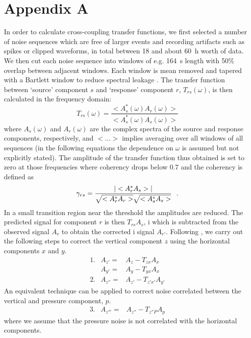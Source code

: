 \documentclass{article}
\begin{document}
{\section*{Appendix A}
In order to calculate cross-coupling transfer functions, 
we first selected a number of noise sequences which are free of
larger events and recording artifacts such as spikes or clipped
waveforms, in total between 18 and about 60~h worth of data. We then cut each
noise sequence into windows of e.g. 164~s length with 50\% overlap between
adjacent windows.  Each window is mean removed and 
tapered with a Bartlett window to reduce spectral leakage \citep{press:92}.
The transfer function between `source' component $s$ and `response'
component $r$, $T_{rs}(\omega)$, is then calculated in the frequency domain:
\begin{displaymath}
T_{rs}(\omega)=\frac{<A_s^*(\omega)A_r(\omega)>}{<A_s^*(\omega)A_s(\omega)>}
\end{displaymath}
where $A_s(\omega)$ and $A_r(\omega)$ are the complex spectra of the
source and response components, respectively, and $<\ldots>$
implies averaging over all windows of all sequences (in the following
equations the dependence on $\omega$ is assumed but not explicitly stated).
The amplitude of the transfer function thus obtained is set to zero at
those frequencies where coherency drops below 0.7 and the coherency is defined as
\begin{displaymath}
\gamma_{rs}=\frac{|<A_r^*A_s>|}{\sqrt{<A_r^*A_r>}\sqrt{<A_s^*A_s>}}\ \ 
{\bf .}
\end{displaymath}
In a small transition region near the threshold the amplitudes are reduced.  
The predicted signal for component $r$ is then $T_{rs} A_s$, i
which is subtracted from the observed signal $A_r$ to obtain the corrected i
signal $A_{r'}$.  
Following \citet{crawford:00}, we carry out the following steps to correct 
the vertical component $z$ using the horizontal components $x$ and $y$.
\begin{eqnarray*}
1. & A_{z'}= & A_z-T_{zx}A_x \\
   & A_{y'}= & A_y-T_{yx}A_x \\
2. & A_{z''}= & A_{z'}-T_{z'x'}A_{y'}
\end{eqnarray*}
An equivalent technique can be applied to correct noise correlated
between the vertical and pressure component, $p$.
\begin{eqnarray*}
3. & A_{z'''}= & A_{z''}-T_{z''P}A_p
\end{eqnarray*}
where we assume that the pressure noise is not correlated with the
horizontal components. 

}
\end{document}
